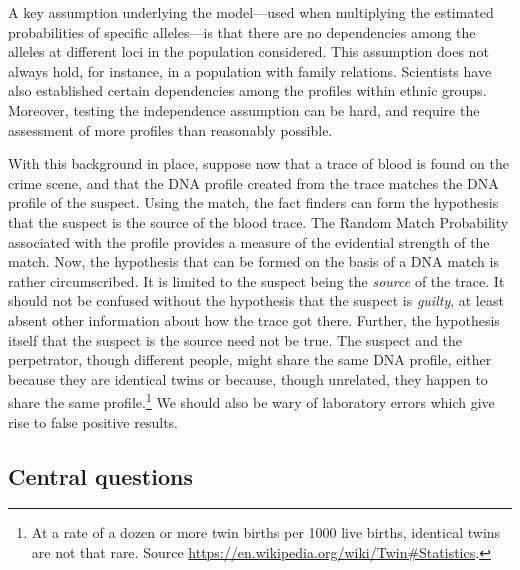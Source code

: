 \documentclass[10pt]{article}
\begin{document}
A key assumption underlying the model---used when multiplying the estimated probabilities of specific alleles---is that there are no 
dependencies among the alleles at different loci in the population considered. This assumption does not always hold, for instance, in a population 
with family relations. Scientists have also established certain dependencies among the profiles within ethnic groups. 
Moreover, testing the independence assumption can be hard, and require the assessment of more profiles than reasonably possible. 

With this background in place, suppose now that a trace of blood is found on the crime scene, and that the DNA profile created from the trace matches the DNA profile of the suspect. Using the match, 
the fact finders can form the hypothesis that the suspect is the source of the blood trace. The Random Match Probability associated with the profile provides 
a measure of the evidential strength of the match. %
Now, the hypothesis that can be formed on the basis of a DNA match is rather circumscribed. 
It is limited to the suspect being the \textit{source} of the trace. 
It should not be confused without the hypothesis that the suspect is \textit{guilty}, at least 
absent other information about how the trace got there. 
Further, the hypothesis itself that the suspect is the source 
need not be true. The suspect and the perpetrator, though different people, might share 
the same DNA profile, either because they are identical twins or because, though unrelated, 
they happen to share the same profile.\footnote{At a rate of a dozen or more twin births per 1000 live births, identical twins are not that rare. 
Source \url{https://en.wikipedia.org/wiki/Twin\#Statistics}.} We should also be wary 
of laboratory errors which give rise to false positive results. 


\subsection{Central questions}
\end{document}
